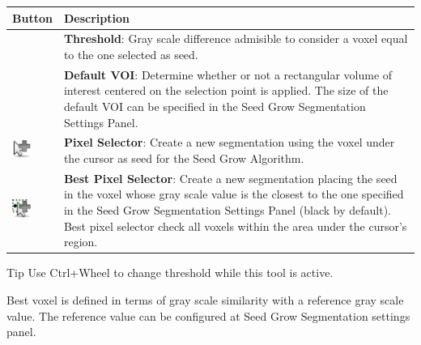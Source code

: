 \begin{tabular}{| m{1.3cm} | m{12cm} |}
\hline
\textbf{Button} & \textbf{Description}\\
\hline
& %
\textbf{Threshold}: Gray scale difference admisible to consider a voxel equal to
the one selected as seed. \\
\hline
& %
\textbf{Default VOI}: Determine whether or not a rectangular volume of interest
centered on the selection point is applied. The size of the default VOI can be
specified in the Seed Grow Segmentation Settings Panel.\\
\hline
\includegraphics[width=0.6cm]{../../frontend/toolbar/seedgrow/rsc/pixelSelector} &
\textbf{Pixel Selector}: Create a new segmentation using the voxel under the
cursor as seed for the Seed Grow Algorithm.\\
\hline
\includegraphics[width=0.6cm]{../../frontend/toolbar/seedgrow/rsc/bestPixelSelector} &
\textbf{Best Pixel Selector}: Create a new segmentation placing the seed in the
voxel whose gray scale value is the closest to the one specified in the Seed
Grow Segmentation Settings Panel (black by default). Best pixel selector check
all voxels within the area under the cursor's region.\\
\hline
\end{tabular}

\vspace{0.3cm}
\begin{bclogo}[couleur = yellow!33, logo= \bcbook]
{Tip} Use Ctrl+Wheel to change threshold while this tool is active.
\end{bclogo}
\vspace{0.3cm}

Best voxel is defined in terms of gray scale similarity with a
reference gray scale value. The reference value can be configured at Seed Grow
Segmentation settings panel.\\

